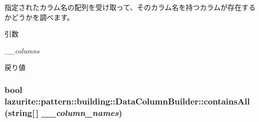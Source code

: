 指定されたカラム名の配列を受け取って、そのカラム名を持つカラムが存在するかどうかを調べます。 
\begin{DoxyParams}{引数}
\item[{\em \_\-\_\-columns}]\end{DoxyParams}
\begin{DoxyReturn}{戻り値}

\end{DoxyReturn}
\hypertarget{classlazurite_1_1pattern_1_1building_1_1_data_column_builder_ae849fb9f8ef479ce8b073acdc8468e47}{
\subsubsection[{containsAll}]{\setlength{\rightskip}{0pt plus 5cm}bool lazurite::pattern::building::DataColumnBuilder::containsAll (string\mbox{[}$\,$\mbox{]} {\em \_\-\_\-column\_\-names})}}
\label{classlazurite_1_1pattern_1_1building_1_1_data_column_builder_ae849fb9f8ef479ce8b073acdc8468e47}


